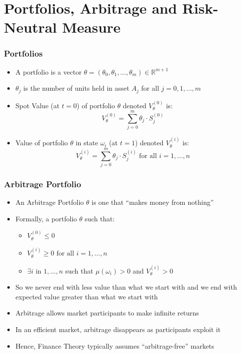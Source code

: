 \documentclass{beamer}
\begin{document}
\section{Portfolios, Arbitrage and Risk-Neutral Measure}
\begin{frame}
\frametitle{Portfolios}
\begin{itemize}
\item A portfolio is a vector $\theta = (\theta_0, \theta_1, \ldots, \theta_m) \in \mathbb{R}^{m+1}$
\item $\theta_j$ is the number of units held in asset $A_j$ for all $j = 0, 1, \ldots, m$
\item Spot Value (at $t=0$) of portfolio $\theta$ denoted $V_{\theta}^{(0)}$ is:
$$V_{\theta}^{(0)} = \sum_{j=0}^m \theta_j \cdot S_j^{(0)}$$
\item Value of portfolio $\theta$ in state $\omega_i$ (at $t=1$) denoted $V_{\theta}^{(i)}$ is:
$$V_{\theta}^{(i)} = \sum_{j=0}^m \theta_j \cdot S_j^{(i)} \mbox{ for all } i = 1, \ldots, n$$
\end{itemize}
\end{frame}


\begin{frame}
\frametitle{Arbitrage Portfolio}
\begin{itemize}
\item An Arbitrage Portfolio $\theta$ is one that ``makes money from nothing''
\item Formally, a portfolio $\theta$ such that:
\begin{itemize}
\item $V_{\theta}^{(0)} \leq 0$
\item $V_{\theta}^{(i)} \geq 0 \mbox{ for all } i = 1, \ldots,n$
\item $\exists i$ in $1, \ldots, n$ such that $\mu(\omega_i) > 0$ and $V_{\theta}^{(i)} > 0$
\end{itemize}
\item So we never end with less value than what we start with and we end with expected value greater than what we start with
\item Arbitrage allows market participants to make infinite returns
\item In an efficient market, arbitrage disappears as participants exploit it
\item Hence, Finance Theory typically assumes ``arbitrage-free'' markets
\end{itemize}
\end{frame}
\end{document}
